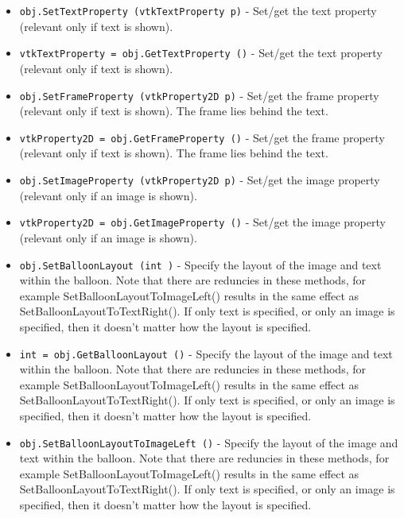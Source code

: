 \begin{itemize}
\item  \verb|obj.SetTextProperty (vtkTextProperty p)| -  Set/get the text property (relevant only if text is shown).

\item  \verb|vtkTextProperty = obj.GetTextProperty ()| -  Set/get the text property (relevant only if text is shown).

\item  \verb|obj.SetFrameProperty (vtkProperty2D p)| -  Set/get the frame property (relevant only if text is shown).
 The frame lies behind the text.

\item  \verb|vtkProperty2D = obj.GetFrameProperty ()| -  Set/get the frame property (relevant only if text is shown).
 The frame lies behind the text.

\item  \verb|obj.SetImageProperty (vtkProperty2D p)| -  Set/get the image property (relevant only if an image is shown).

\item  \verb|vtkProperty2D = obj.GetImageProperty ()| -  Set/get the image property (relevant only if an image is shown).

\item  \verb|obj.SetBalloonLayout (int )| -  Specify the layout of the image and text within the balloon. Note that
 there are reduncies in these methods, for example
 SetBalloonLayoutToImageLeft() results in the same effect as
 SetBalloonLayoutToTextRight(). If only text is specified, or only an
 image is specified, then it doesn't matter how the layout is specified.

\item  \verb|int = obj.GetBalloonLayout ()| -  Specify the layout of the image and text within the balloon. Note that
 there are reduncies in these methods, for example
 SetBalloonLayoutToImageLeft() results in the same effect as
 SetBalloonLayoutToTextRight(). If only text is specified, or only an
 image is specified, then it doesn't matter how the layout is specified.

\item  \verb|obj.SetBalloonLayoutToImageLeft ()| -  Specify the layout of the image and text within the balloon. Note that
 there are reduncies in these methods, for example
 SetBalloonLayoutToImageLeft() results in the same effect as
 SetBalloonLayoutToTextRight(). If only text is specified, or only an
 image is specified, then it doesn't matter how the layout is specified.


\end{itemize}
